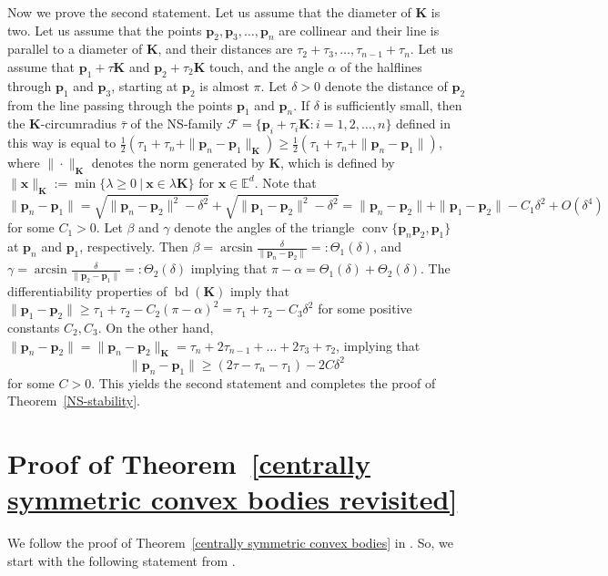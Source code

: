 \documentclass[12pt]{article}
\DeclareMathOperator{\conv}{conv}
\DeclareMathOperator{\bd}{bd}
\newcommand{\xx}{\mathbf{x}}
\newcommand{\KK}{\mathbf K}
\newcommand{\Ee}{{\mathbb E}}
\newcommand{\p}{\mathbf{p}}
\begin{document}
Now we prove the second statement. Let us assume that the diameter of $\KK$ is two. Let us assume that the points $\p_2,\p_3, \ldots, \p_n$ are collinear and their line is parallel to a diameter of $\KK$, and their distances are $\tau_2+\tau_3, \ldots, \tau_{n-1}+\tau_n$. Let us assume that $\p_1+ \tau \KK$ and $\p_2 + \tau_2 \KK$ touch, and the angle $\alpha$ of the halflines through $\p_1$ and $\p_3$, starting at $\p_2$ is almost $\pi$. Let $\delta > 0$ denote the distance of $\p_2$ from the line passing through the points $\p_1$ and $\p_n$. If $\delta$ is sufficiently small, then the $\KK$-circumradius $\bar{\tau}$ of the NS-family $\mathcal{F}= \{ \p_i + \tau_i \KK : i=1,2,\ldots,n\}$ defined in this way is equal to $\frac{1}{2} (\tau_1 + \tau_n + \|\p_n-\p_1\|_{\KK}) \geq \frac{1}{2} (\tau_1 + \tau_n + \|\p_n-\p_1\|)$, where $\| \cdot \|_{\KK}$ denotes the norm generated by $\KK$, which is defined by $\|\xx\|_{\KK}:=\min\{\lambda \geq 0\  |\  \xx\in \lambda \KK\}$ for $\xx\in \Ee^d$. Note that
\[
\|\p_n-\p_1\| = \sqrt{\|\p_n-\p_2\|^2 - \delta^2} + \sqrt{\|\p_1-\p_2\|^2 - \delta^2} = \|\p_n - \p_2\| + \|\p_1 - \p_2\| - C_1\delta^2 + O(\delta^4)
\]
for some $C_1 > 0$. Let $\beta$ and $\gamma$ denote the angles of the triangle $\conv \{ \p_n \p_2, \p_1\}$ at $\p_n$ and $\p_1$, respectively.
Then $\beta = \arcsin \frac{\delta}{\|\p_n-\p_2\|} =: \Theta_1(\delta)$, and $\gamma = \arcsin \frac{\delta}{\|\p_2-\p_1\|} =: \Theta_2(\delta)$ implying that $\pi-\alpha = \Theta_1(\delta)+\Theta_2(\delta)$. The differentiability properties of $\bd(\KK)$ imply that $\|\p_1 - \p_2\| \geq  \tau_1 + \tau_2 - C_2 (\pi-\alpha)^2 = \tau_1 + \tau_2 - C_3 \delta^2$ for some positive constants $C_2, C_3$.
On the other hand, $\|\p_n - \p_2\|=\|\p_n - \p_2\|_{\KK}=\tau_n + 2\tau_{n-1} + \ldots + 2\tau_3 + \tau_2$, implying that
\[
\|\p_n-\p_1\| \geq (2\tau-\tau_n-\tau_1) - 2C \delta^2
\]
for some $C > 0$. This yields the second statement and completes the proof of Theorem~\ref{NS-stability}.



\section{Proof of Theorem~\ref{centrally symmetric convex bodies revisited}}

We follow the proof of Theorem~\ref{centrally symmetric convex bodies} in \cite{BezLan16}. So, we start with the following statement from \cite{GG45}.
\end{document}
